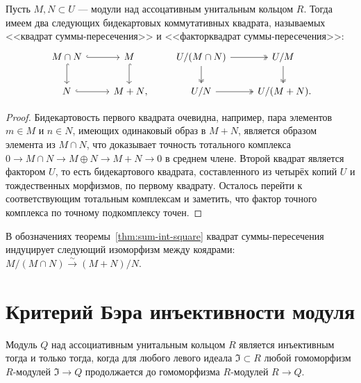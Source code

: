 \documentclass[
	extrafontsizes,
	11pt,
	hyphens,
]{memoir}
\begin{document}
\begin{theorem}
Пусть \(M, N \subset U\) --- модули над ассоцативным унитальным кольцом \(R\).
Тогда имеем два следующих бидекартовых
коммутативных квадрата, называемых <<квадрат сум\-мы-пе\-ре\-се\-че\-ния>> и <<факторквадрат суммы-пересечения>>:
\begin{equation*}
\begin{tikzcd}
	M \cap N \ar[hookrightarrow]{r} \ar[hookrightarrow]{d} & M \ar[hookrightarrow]{d} & U / (M \cap N) \ar[twoheadrightarrow]{r} \ar[twoheadrightarrow]{d} & U / M \ar[twoheadrightarrow]{d} \\
	N \ar[hookrightarrow]{r} & {M + N\mathrlap{,}} & U / N \ar[twoheadrightarrow]{r} & U / (M + N)\mathrlap{.}
\end{tikzcd}
\end{equation*}
\end{theorem}

\begin{proof}
Бидекартовость первого квадрата очевидна, например, пара элементов \(m \in M\) и \(n \in N\), имеющих одинаковый образ в \(M+N\), является образом элемента из \(M \cap N\), что доказывает точность тотального комплекса \(0 \to M \cap N \to M \oplus N \to M + N \to 0\) в среднем члене. Второй квадрат является фактором \(U\), то есть бидекартового квадрата, составленного из четырёх копий \(U\) и тождественных морфизмов, по первому квадрату. Осталось перейти к соответствующим тотальным комплексам и заметить, что фактор точного комплекса по точному подкомплексу точен.
\end{proof}

\begin{corollary}
В обозначениях теоремы~\ref{thm:sum-int-square} квадрат суммы-пересечения индуцирует следующий изоморфизм между коядрами:
\(M / (M \cap N) \xrightarrow{\sim} (M+N) / N\).
\end{corollary}


\section{Критерий Бэра инъективности модуля}

\begin{theorem}
Модуль \(Q\) над ассоциативным унитальным кольцом \(R\) является инъективным тогда и только тогда, когда для любого левого идеала \(\mathfrak{I} \subset R\) любой гомоморфизм \(R\)-мо\-ду\-лей \(\mathfrak{I} \to Q\) продолжается до гомоморфизма \(R\)-мо\-ду\-лей \(R \to Q\).
\end{theorem}
\end{document}
